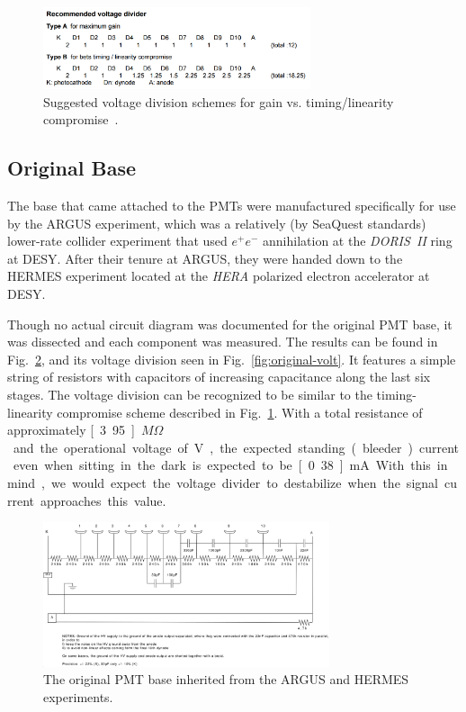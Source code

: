 \begin{figure}
	\centering
	\includegraphics[width=0.7\textwidth]{figures/voltage_divider.png}
	\caption{Suggested voltage division schemes for gain vs. timing/linearity compromise~\cite{tubespecs}.}
	\label{fig:voltage_schemes}
\end{figure}

\subsection{Original Base}

The base that came attached to the PMTs were manufactured specifically for use by the ARGUS experiment, which was a relatively (by SeaQuest standards) lower-rate collider experiment that used $e^+ e^-$ annihilation at the \emph{DORIS\ II} ring at DESY. After their tenure at ARGUS, they were handed down to the HERMES experiment located at the \emph{HERA} polarized electron accelerator at DESY.

Though no actual circuit diagram was documented for the original PMT base, it was dissected and each component was measured. The results can be found in Fig.~\ref{fig:original-board}, and its voltage division seen in Fig.~\ref{fig:original-volt}. It features a simple string of resistors with capacitors of increasing capacitance along the last six stages. The voltage division can be recognized to be similar to the timing-linearity compromise scheme described in Fig.~\ref{fig:voltage_schemes}. With a total resistance of approximately \unit[3.95]{$M\Omega$} and the operational voltage of \unit[-1500]{V}, the expected standing (bleeder) current even when sitting in the dark is expected to be \unit[0.38]{mA}. With this in mind, we would expect the voltage divider to destabilize when the signal current approaches this value.

\begin{figure}
	\centerline{
		\mbox{\includegraphics[width=0.75\textwidth]{figures/pmt.png}}
	}
	\caption{The original PMT base inherited from the ARGUS and HERMES experiments.}
	\label{fig:original-board}
\end{figure}

